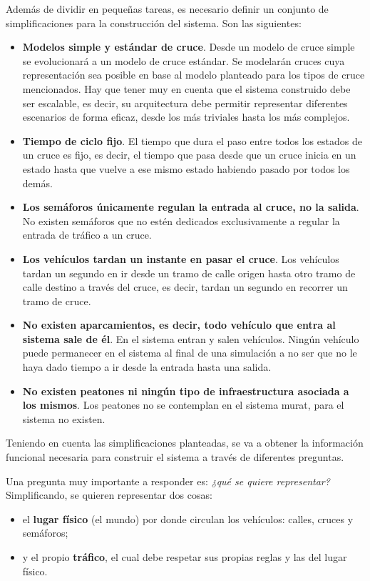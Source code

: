 Además de dividir en pequeñas tareas, es necesario definir un conjunto de simplificaciones para la construcción del sistema. Son las siguientes:
\begin{itemize}
    \item \textbf{Modelos simple y estándar de cruce}. Desde un modelo de cruce simple se evolucionará a un modelo de cruce estándar. Se modelarán cruces cuya representación sea posible en base al modelo planteado para los tipos de cruce mencionados. Hay que tener muy en cuenta que el sistema construido debe ser escalable, es decir, su arquitectura debe permitir representar diferentes escenarios de forma eficaz, desde los más triviales hasta los más complejos.
    \item \textbf{Tiempo de ciclo fijo}. El tiempo que dura el paso entre todos los estados de un cruce es fijo, es decir, el tiempo que pasa desde que un cruce inicia en un estado hasta que vuelve a ese mismo estado habiendo pasado por todos los demás.
    \item \textbf{Los semáforos únicamente regulan la entrada al cruce, no la salida}. No existen semáforos que no estén dedicados exclusivamente a regular la entrada de tráfico a un cruce.
    \item \textbf{Los vehículos tardan un instante en pasar el cruce}. Los vehículos tardan un segundo en ir desde un tramo de calle origen hasta otro tramo de calle destino a través del cruce, es decir, tardan un segundo en recorrer un tramo de cruce.
    \item \textbf{No existen aparcamientos, es decir, todo vehículo que entra al sistema sale de él}. En el sistema entran y salen vehículos. Ningún vehículo puede permanecer en el sistema al final de una simulación a no ser que no le haya dado tiempo a ir desde la entrada hasta una salida.
    \item \textbf{No existen peatones ni ningún tipo de infraestructura asociada a los mismos}. Los peatones no se contemplan en el sistema \acrshort{murat}, para el sistema no existen.
\end{itemize}

Teniendo en cuenta las simplificaciones planteadas, se va a obtener la información funcional necesaria para construir el sistema a través de diferentes preguntas.

Una pregunta muy importante a responder es: \textit{¿qué se quiere representar?} Simplificando, se quieren representar dos cosas:
\begin{itemize}
    \item el \textbf{lugar físico} (el mundo) por donde circulan los vehículos: calles, cruces y semáforos;
    \item y el propio \textbf{tráfico}, el cual debe respetar sus propias reglas y las del lugar físico.
\end{itemize}


